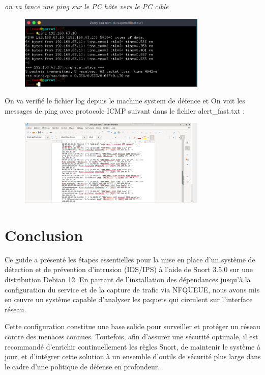\documentclass[12pt]{article}
\begin{document}
\textit{on va lance une ping sur le PC hôte vers le PC cible }
\begin{figure}[H] 
    \centering
    \includegraphics[width=0.8\textwidth]{captures/image9.png}
    \label{fig:mon_image}
\end{figure}
On va verifié le fichier log depuis le machine system de défence et On voit les messages de ping avec protocole ICMP suivant dans le fichier alert\_fast.txt :
\begin{figure}[H] 
    \centering
    \includegraphics[width=0.8\textwidth]{captures/image8.png}
    \label{fig:mon_image}
\end{figure}

\section*{Conclusion}

Ce guide a présenté les étapes essentielles pour la mise en place d’un système de détection et de prévention d'intrusion (IDS/IPS) à l’aide de Snort 3.5.0 sur une distribution Debian 12. En partant de l’installation des dépendances jusqu’à la configuration du service et de la capture de trafic via NFQUEUE, nous avons mis en œuvre un système capable d’analyser  les paquets qui circulent sur l’interface réseau.

Cette configuration constitue une base solide pour surveiller et protéger un réseau contre des menaces connues. Toutefois, afin d'assurer une sécurité optimale, il est recommandé d’enrichir continuellement les règles Snort, de maintenir le système à jour, et d’intégrer cette solution à un ensemble d’outils de sécurité plus large dans le cadre d’une politique de défense en profondeur.
\end{document}
